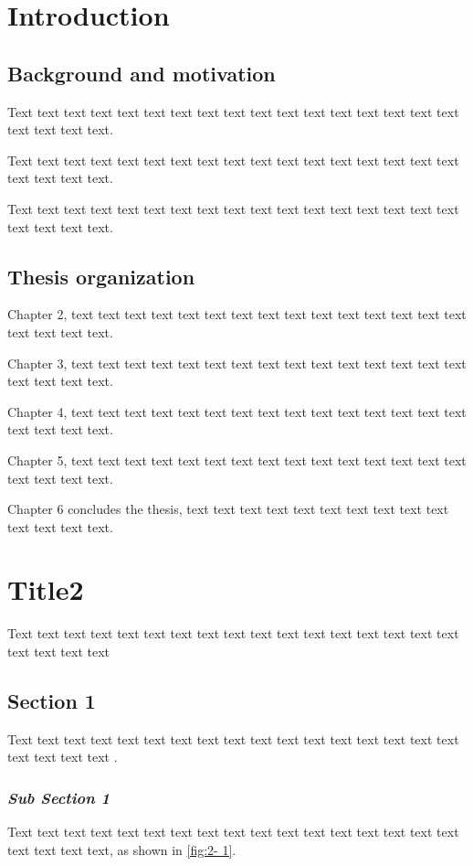 \documentclass[12pt,a4paper]{article}
\numberwithin{equation}{section}
\begin{document}
{{\section{Introduction}
\subsection{Background and motivation}
\hspace{2em}Text text text text text text text text text text text text text text text text text text text text text.

Text text text text text text text text text text text text text text text text text text text text text.

Text text text text text text text text text text text text text text text text text text text text text.
\subsection{Thesis organization}
\hspace{2em}Chapter 2, text text text text text text text text text text text text text text text text text text text. 

Chapter 3, text text text text text text text text text text text text text text text text text text text. 

Chapter 4, text text text text text text text text text text text text text text text text text text text. 

Chapter 5, text text text text text text text text text text text text text text text text text text text. 

Chapter 6 concludes the thesis, text text text text text text text text text text text
text text text.

\clearpage
\section{Title2}
\hspace{2em}Text text text text text text text text text text text text text text text text text text text text text
\subsection{Section 1}
\hspace{2em}Text text text text text text text text text text text text text text text text text text text text text \cite{1}.

\subsubsection{\textit{Sub Section 1}}
\hspace{2em}Text text text text text text text text text text text text text text text text text text text text text, as shown in \cref{fig:2- 1}.

}}
\end{document}
